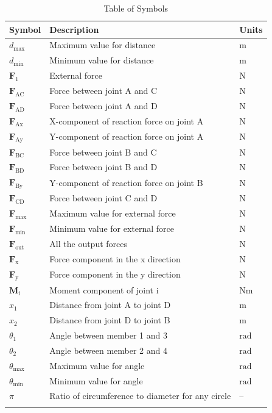 \documentclass[12pt]{article}
\begin{document}
\begin{longtable}{l l l}
\toprule
\textbf{Symbol} & \textbf{Description} & \textbf{Units}
\\
\midrule
\endhead
${d_{\text{max}}}$ & Maximum  value for distance & ${\text{m}}$
\\
${d_{\text{min}}}$ & Minimum  value for distance & ${\text{m}}$
\\
${\mathbf{F}_{1}}$ & External force & ${\text{N}}$
\\
${\mathbf{F}_{\text{AC}}}$ & Force between joint A and C & ${\text{N}}$
\\
${\mathbf{F}_{\text{AD}}}$ & Force between joint A and D & ${\text{N}}$
\\
${\mathbf{F}_{\text{Ax}}}$ & X-component of reaction force on joint A & ${\text{N}}$
\\
${\mathbf{F}_{\text{Ay}}}$ & Y-component of reaction force on joint A & ${\text{N}}$
\\
${\mathbf{F}_{\text{BC}}}$ & Force between joint B and C & ${\text{N}}$
\\
${\mathbf{F}_{\text{BD}}}$ & Force between joint B and D & ${\text{N}}$
\\
${\mathbf{F}_{\text{By}}}$ & Y-component of reaction force on joint B & ${\text{N}}$
\\
${\mathbf{F}_{\text{CD}}}$ & Force between joint C and D & ${\text{N}}$
\\
${\mathbf{F}_{\text{max}}}$ & Maximum  value for external force & ${\text{N}}$
\\
${\mathbf{F}_{\text{min}}}$ & Minimum  value for external force & ${\text{N}}$
\\
${\mathbf{F}_{\text{out}}}$ & All the output forces & ${\text{N}}$
\\
${\mathbf{F}_{\text{x}}}$ & Force component in the x direction & ${\text{N}}$
\\
${\mathbf{F}_{\text{y}}}$ & Force component in the y direction & ${\text{N}}$
\\
${\mathbf{M}_{\text{i}}}$ & Moment component of joint i & $\text{N}\text{m}$
\\
${x_{\text{1}}}$ & Distance from joint A to joint D & ${\text{m}}$
\\
${x_{\text{2}}}$ & Distance from joint D to joint B & ${\text{m}}$
\\
${θ_{\text{1}}}$ & Angle between member 1 and 3 & ${\text{rad}}$
\\
${θ_{\text{2}}}$ & Angle between member 2 and 4 & ${\text{rad}}$
\\
${θ_{\text{max}}}$ & Maximum  value for angle & ${\text{rad}}$
\\
${θ_{\text{min}}}$ & Minimum  value for angle & ${\text{rad}}$
\\
$π$ & Ratio of circumference to diameter for any circle & --
\\
\bottomrule
\caption{Table of Symbols}
\label{Table:ToS}
\end{longtable}
\end{document}
